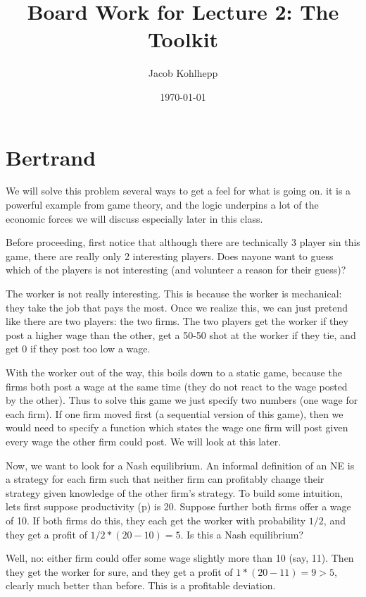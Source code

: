 \documentclass{article}
\title{Board Work for Lecture 2: The Toolkit}
\author{Jacob Kohlhepp}
\date{\today}
\begin{document}
\maketitle

\section{Bertrand}

We will solve this problem several ways to get a feel for what is going on. it is a powerful example from game theory, and the logic underpins a lot of the economic forces we will discuss especially later in this class. 

Before proceeding, first notice that although there are technically 3 player sin this game, there are really only 2 interesting players. Does nayone want to guess which of the players is not interesting (and volunteer a reason for their guess)?

The worker is not really interesting. This is because the worker is mechanical: they take the job that pays the most. Once we realize this, we can just pretend like there are two players: the two firms. The two players get the worker if they post a higher wage than the other, get a 50-50 shot at the worker if they tie, and get 0 if they post too low a wage.

With the worker out of the way, this boils down to a static game, because the firms both post a wage at the same time (they do not react to the wage posted by the other). Thus to solve this game we just specify two numbers (one wage for each firm). If one firm moved first (a sequential version of this game), then we would need to specify a function which states the wage one firm will post given every wage the other firm could post. We will look at this later.

Now, we want to look for a Nash equilibrium. An informal definition of an NE is a strategy for each firm such that neither firm can profitably change their strategy given knowledge of the other firm's strategy. To build some intuition, lets first suppose productivity (p) is 20. Suppose further both firms offer a wage of 10. If both firms do this, they each get the worker with probability $1/2$, and they get a profit of $1/2*(20-10)=5$. Is this a Nash equilibrium?

Well, no: either firm could offer some wage slightly more than 10 (say, 11). Then they get the worker for sure, and they get a profit of $1*(20-11)=9>5$, clearly much better than before. This is a profitable deviation.
\end{document}
